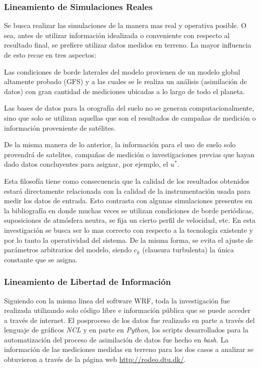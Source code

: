 \subsubsection{Lineamiento de Simulaciones Reales}
Se busca realizar las simulaciones de la manera mas real y operativa posible. O sea, antes de utilizar información idealizada o conveniente con respecto al resultado final, se prefiere utilizar datos medidos en terreno. La mayor influencia de esto recae en tres aspectos:
\begin{enumerate*}
	\item Las condiciones de borde laterales del modelo provienen de un modelo global altamente probado (GFS) y a las cuales se le realiza un análisis (asimilación de datos) con  gran cantidad de mediciones ubicadas a lo largo de todo el planeta.
	\item Las bases de datos para la orografía del suelo no se generan computacionalmente, sino que solo se utilizan aquellas que son el resultados de campañas de medición o información proveniente de satélites.
	\item De la misma manera de lo anterior, la información para el uso de suelo solo provendrá de satelites, campañas de medición o investigaciones previas que hayan dado datos concluyentes para asignar, por ejemplo, el $u^*$.
\end{enumerate*}
Esta filosofía tiene como consecuencia que la calidad de los resultados obtenidos estará directamente relacionada con la calidad de la instrumentación usada para medir los datos de entrada. Esto contrasta con algunas simulaciones presentes en la bibliografía en donde muchas veces se utilizan condiciones de borde periódicas, suposiciones de atmósfera neutra, se fija un cierto perfil de velocidad, etc. En esta investigación se busca ser lo mas correcto con respecto a la tecnología existente y por lo tanto la operatividad del sistema. De la misma forma, se evita el ajuste de parámetros arbitrarios del modelo, siendo $c_k$ (clausura turbulenta) la única constante que se asigna.
\subsubsection{Lineamiento de Libertad de Información}
Siguiendo con la misma linea del software WRF, toda la investigación fue realizada utilizando solo código libre e información pública que se puede acceder a través de internet. El posproceso de los datos fue realizado en parte a través del lenguaje de gráficos \emph{NCL} y en parte en \emph{Python}, los scripts desarrollados para la automatización del proceso de asimilación de datos fue hecho en \emph{bash}. La información de las mediciones medidas en terreno para los dos casos a analizar se obtuvieron a través de la página web \url{http://rodeo.dtu.dk/}.
